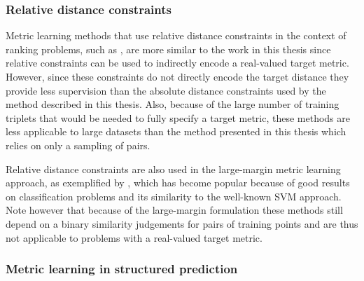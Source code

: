 \subsubsection{Relative distance constraints}

Metric learning methods that use relative distance constraints in the context of ranking problems, such as \cite{schultz2003learning}, are more similar to the work in this thesis since relative constraints can be used to indirectly encode a real-valued target metric. However, since these constraints do not directly encode the target distance they provide less supervision than the absolute distance constraints used by the method described in this thesis. Also, because of the large number of training triplets that would be needed to fully specify a target metric, these methods are less applicable to large datasets than the method presented in this thesis which relies on only a sampling of pairs.

Relative distance constraints are also used in the large-margin metric learning approach, as exemplified by \cite{weinberger2009distance, frome2007learning}, which has become popular because of good results on classification problems and its similarity to the well-known \ac{SVM} approach. Note however that because of the large-margin formulation these methods still depend on a binary similarity judgements for pairs of training points and are thus not applicable to problems with a real-valued target metric.


\subsubsection{Metric learning in structured prediction}

